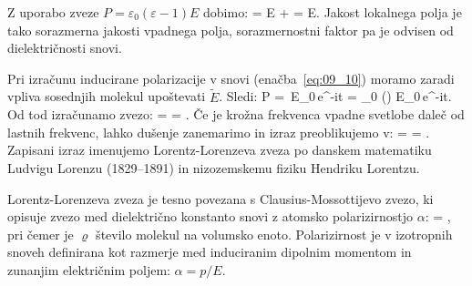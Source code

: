Z uporabo zveze
$P = \varepsilon_0 (\varepsilon -1) E$ dobimo:
\beq
{} = E +  = 
E.
\label{eq:09_32}
\eeq
Jakost lokalnega polja je tako sorazmerna jakosti vpadnega polja, sorazmernostni
faktor pa je odvisen od dielektričnosti snovi.

Pri izračunu inducirane polarizacije v snovi (enačba~\ref{eq:09_10}) 
moramo zaradi vpliva sosednjih molekul upoštevati $\tilde{E}$. Sledi:
\beq
P = 
\,E_0\,e^{-i\omega t}
= \varepsilon_0 () E_0\,e^{-i\omega t}.
\label{eq:09_33}
\eeq
Od tod izračunamo zvezo:
\beq
{} =  = 
.
\label{eq:09_34}
\eeq
Če je krožna frekvenca vpadne svetlobe daleč od lastnih frekvenc, lahko dušenje zanemarimo in 
izraz preoblikujemo v:
\beq
{} =  = 
.
\label{eq:09_35}
\eeq
Zapisani izraz imenujemo Lorentz-Lorenzeva zveza po danskem matematiku Ludvigu Lorenzu 
(1829--1891) in nizozemskemu fiziku Hendriku Lorentzu. 

\begin{remark}
 Lorentz-Lorenzeva zveza je tesno povezana s Clausius-Mossottijevo zvezo, ki opisuje
 zvezo med dielektrično konstanto snovi z atomsko polarizirnostjo $\alpha$:
 \beq
{} = ,
\label{eq:09_35a}
\eeq
pri čemer je $\varrho$ število molekul na volumsko enoto. Polarizirnost je v izotropnih
snoveh definirana kot razmerje med induciranim dipolnim momentom in zunanjim električnim
poljem: $\alpha = p/E$.
\end{remark}

